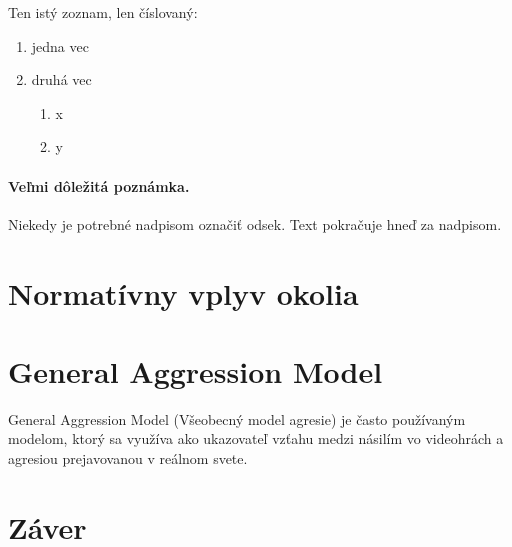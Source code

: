 \documentclass[10pt,twoside,slovak,a4paper]{article}
\begin{document}
Ten istý zoznam, len číslovaný:

\begin{enumerate}
\item jedna vec
\item druhá vec
	\begin{enumerate}
	\item x
	\item y
	\end{enumerate}
\end{enumerate}

\paragraph{Veľmi dôležitá poznámka.}
Niekedy je potrebné nadpisom označiť odsek. Text pokračuje hneď za nadpisom.


\section{Normatívny vplyv okolia} \label{normat}



\section{General Aggression Model} \label{GAM}
General Aggression Model (Všeobecný model agresie) je často používaným modelom, ktorý sa využíva ako ukazovateľ vzťahu medzi násilím vo videohrách a agresiou prejavovanou v reálnom svete.



\section{Záver} \label{zaver} %






\end{document}
